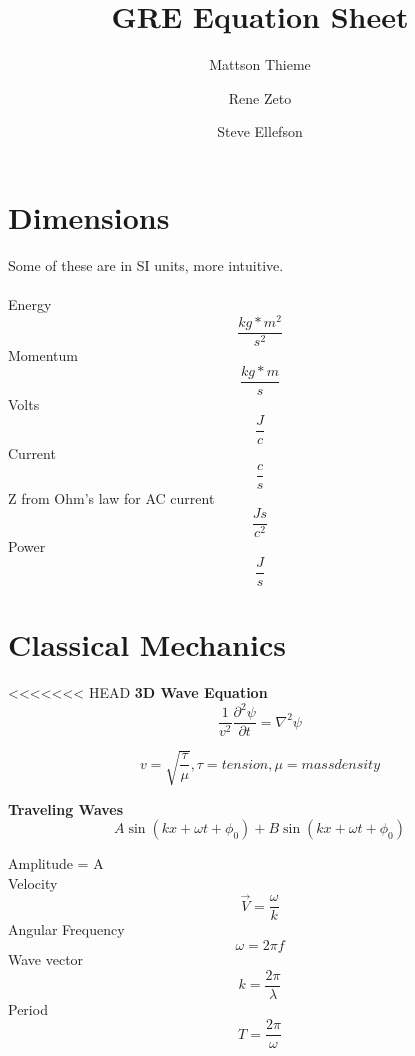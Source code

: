 \documentclass{article}
\begin{document}
\title{GRE Equation Sheet}
\author{Mattson Thieme \and Rene Zeto \and Steve Ellefson}
\maketitle


\section{Dimensions} Some of these are in SI units, more intuitive.\\
\\
Energy\begin{equation}\frac{kg*m^2}{s^2}
\end{equation} 
Momentum\begin{equation}\frac{kg*m}{s}\end{equation}
Volts\begin{equation}\frac{J}{c}\end{equation}
Current\begin{equation}\frac{c}{s}\end{equation}
Z from Ohm's law for AC current\begin{equation}\frac{Js}{c^2}\end{equation}
Power\begin{equation}\frac{J}{s}\end{equation}






\section{Classical Mechanics}
<<<<<<< HEAD
{\bf{3D Wave Equation}}\begin{equation}\frac{1}{v^2} \frac{\partial^2\psi}{\partial t}= \nabla^2 \psi \end{equation}

\begin{equation}v=\sqrt{\frac{\tau}{\mu}},  \tau=tension, \mu=mass density \end{equation}

{\bf{Traveling Waves}}\begin{equation}A\sin(kx+\omega t + \phi_0)+B\sin(kx+\omega t +\phi_0)\end{equation}

\hspace*{.5in}Amplitude = A\\
\hspace*{.5in}Velocity\begin{equation}\vec{V}=\frac{\omega}{k}\end{equation}
\hspace*{.5in}Angular Frequency\begin{equation}\omega = 2\pi f \end{equation}
\hspace*{.5in}Wave vector\begin{equation}k = \frac{2\pi}{\lambda}\end{equation}
\hspace*{.5in}Period\begin{equation} T = \frac{2\pi}{\omega}\end{equation}
\end{document}
